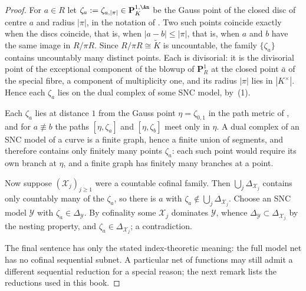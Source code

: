 \begin{proof}
For $a\in R$ let $\zeta_a:=\zeta_{a,|\pi|}\in\mathbf P^{1,\An}_K$ be the
Gauss point of the closed disc of centre $a$ and radius $|\pi|$, in the
notation of .  Two such points coincide exactly when
the discs coincide, that is, when $|a-b|\leq|\pi|$, that is, when $a$ and
$b$ have the same image in $R/\pi R$.  Since
$R/\pi R\cong\widetilde K$ is uncountable, the family
$\{\zeta_a\}$ contains uncountably many distinct points.  Each is
divisorial: it is the divisorial point of the exceptional component of the
blowup of $\mathbf P^1_R$ at the closed point $\bar a$ of the special
fibre, a component of multiplicity one, and its radius $|\pi|$ lies in
$|K^\times|$.  Hence each $\zeta_a$ lies on the dual complex of some SNC
model, by \,(1).

Each $\zeta_a$ lies at distance $1$ from the Gauss point
$\eta=\zeta_{0,1}$ in the path metric of
, and for $a\not\equiv b$ the paths
$[\eta,\zeta_a]$ and $[\eta,\zeta_b]$ meet only in $\eta$.  A dual
complex of an SNC model of a curve is a finite graph, hence a finite union
of segments, and therefore contains only finitely many points $\zeta_a$:
each such point would require its own branch at $\eta$, and a finite graph
has finitely many branches at a point.

Now suppose $(\mathcal X_j)_{j\geq1}$ were a countable cofinal family.
Then $\bigcup_j\Delta_{\mathcal X_j}$ contains only countably many of the
$\zeta_a$, so there is $a$ with
$\zeta_a\notin\bigcup_j\Delta_{\mathcal X_j}$.  Choose an SNC model
$\mathcal Y$ with $\zeta_a\in\Delta_{\mathcal Y}$.  By cofinality some
$\mathcal X_j$ dominates $\mathcal Y$, whence
$\Delta_{\mathcal Y}\subset\Delta_{\mathcal X_j}$ by the nesting property,
and $\zeta_a\in\Delta_{\mathcal X_j}$; a contradiction.

The final sentence has only the stated index-theoretic meaning: the full
model net has no cofinal sequential subnet.  A particular net of functions
may still admit a different sequential reduction for a special reason; the
next remark lists the reductions used in this book.
\end{proof}

